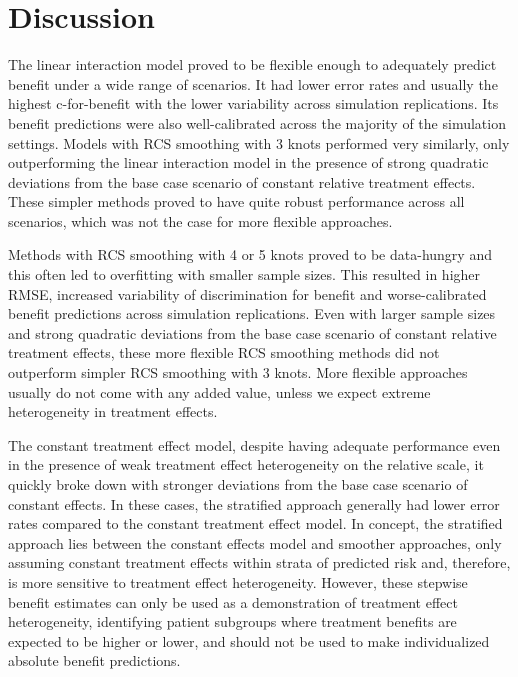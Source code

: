 \documentclass{article}
\begin{document}
\hypertarget{discussion}{%
\section{Discussion}\label{discussion}}

The linear interaction model proved to be flexible enough to adequately
predict benefit under a wide range of scenarios. It had lower error
rates and usually the highest c-for-benefit with the lower variability
across simulation replications. Its benefit predictions were also
well-calibrated across the majority of the simulation settings. Models
with RCS smoothing with 3 knots performed very similarly, only
outperforming the linear interaction model in the presence of strong
quadratic deviations from the base case scenario of constant relative
treatment effects. These simpler methods proved to have quite robust
performance across all scenarios, which was not the case for more
flexible approaches.

Methods with RCS smoothing with 4 or 5 knots proved to be data-hungry
and this often led to overfitting with smaller sample sizes. This
resulted in higher RMSE, increased variability of discrimination for
benefit and worse-calibrated benefit predictions across simulation
replications. Even with larger sample sizes and strong quadratic
deviations from the base case scenario of constant relative treatment
effects, these more flexible RCS smoothing methods did not outperform
simpler RCS smoothing with 3 knots. More flexible approaches usually do
not come with any added value, unless we expect extreme heterogeneity in
treatment effects.

The constant treatment effect model, despite having adequate performance
even in the presence of weak treatment effect heterogeneity on the
relative scale, it quickly broke down with stronger deviations from the
base case scenario of constant effects. In these cases, the stratified
approach generally had lower error rates compared to the constant
treatment effect model. In concept, the stratified approach lies between
the constant effects model and smoother approaches, only assuming
constant treatment effects within strata of predicted risk and,
therefore, is more sensitive to treatment effect heterogeneity. However,
these stepwise benefit estimates can only be used as a demonstration of
treatment effect heterogeneity, identifying patient subgroups where
treatment benefits are expected to be higher or lower, and should not be
used to make individualized absolute benefit predictions.
\end{document}
